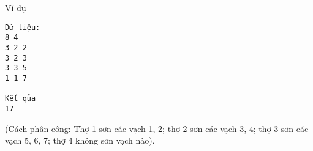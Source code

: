 Ví dụ
\begin{verbatim}
Dữ liệu:
8 4
3 2 2
3 2 3
3 3 5
1 1 7  

Kết qủa
17
\end{verbatim}

   (Cách phân công: Thợ 1 sơn các vạch 1, 2; thợ 2 sơn các vạch 3, 4; thợ 3 sơn các vạch 5, 6, 7; thợ 4 không sơn vạch nào).